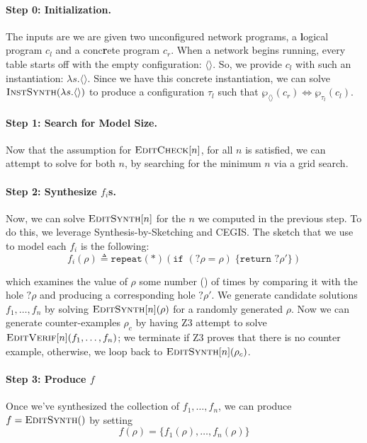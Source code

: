 \paragraph{Step 0: Initialization.} The inputs are we are given two unconfigured
network programs, a \textbf{l}ogical program $c_l$ and a conc\textbf{r}ete
program $c_r$. When a network begins running, every table starts off with the
empty configuration: $\langle\rangle$. So, we provide $c_l$ with such an
instantiation: $\lambda s. \langle \rangle$. Since we have this concrete
instantiation, we can solve $\textsc{InstSynth}(\lambda s. \langle\rangle)$ to
produce a configuration $\tau_l$ such that
$\wp_{\langle\rangle}(c_r) \Leftrightarrow \wp_{\tau_l}(c_l)$.

\paragraph{Step 1: Search for Model Size.} Now that the assumption for
$\textsc{EditCheck}[n]$, for all $n$ is satisfied, we can attempt to solve for
both $n$, by searching for the minimum $n$ via a grid search.

\paragraph{Step 2: Synthesize $f_i$s.} Now, we can solve $\textsc{EditSynth}[n]$
for the $n$ we computed in the previous step. To do this, we leverage
Synthesis-by-Sketching and CEGIS. The sketch that we use to model each $f_i$ is
the following:
\[f_i(\rho) \triangleq \texttt{repeat}(*)\left(\texttt{if }(?\rho = \rho)\;\{\texttt{return }?\rho'\}\right)\]

which examines the value of $\rho$ some number () of times by comparing it with
the hole $?\rho$ and producing a corresponding hole $?\rho'$. We generate
candidate solutions $f_1,\ldots, f_n$ by solving $\textsc{EditSynth}[n](\rho)$
for a randomly generated $\rho$. Now we can generate counter-examples $\rho_c$
by having Z3 attempt to solve $\textsc{EditVerif}[n](f_1,\ldots,f_n)$; we
terminate if Z3 proves that there is no counter example, otherwise, we loop back
to $\textsc{EditSynth}[n](\rho_c)$. 

\paragraph{Step 3: Produce $f$} Once we've synthesized the collection of
$f_1, \ldots, f_n$, we can produce $f = \textsc{EditSynth}()$ by setting
\[f(\rho) = \{f_1(\rho), \ldots, f_n(\rho)\}\]

